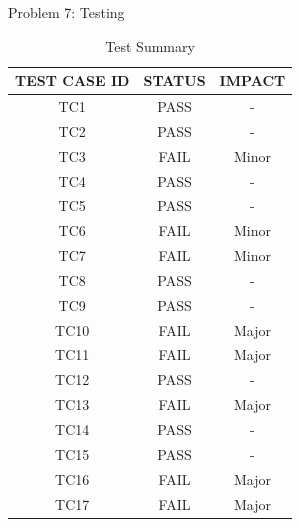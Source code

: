 \documentclass[a4paper,12pt]{article}
\begin{document}
\begin{section}{Problem 7: Testing}
\begin{table}[htp]
	\centering
	\caption{Test Summary} \vspace{0.5cm} \label{tab:difficulty_table} 
	\begin{tabular}{||c|c|c||}
		\hline  \hline \textbf{TEST CASE ID} & \textbf{STATUS} & \textbf{IMPACT} \\
		\hline \hline
		TC1 & PASS & - \\ 
		\hline
		TC2 & PASS & - \\ 
		\hline
		TC3 & FAIL & Minor \\ 
		\hline
		TC4 & PASS & - \\ 
		\hline
		TC5 & PASS & - \\ 
		\hline
		TC6 & FAIL & Minor \\ 
		\hline
		TC7 & FAIL & Minor \\ 
		\hline
		TC8 & PASS & - \\ 
		\hline
		TC9 & PASS & - \\ 
		\hline
		TC10 & FAIL & Major \\ 
		\hline
		TC11 & FAIL & Major \\ 
		\hline
		TC12 & PASS & - \\ 
		\hline
		TC13 & FAIL & Major \\ 
		\hline
		TC14 & PASS & - \\ 
		\hline
		TC15 & PASS & - \\ 
		\hline
		TC16 & FAIL & Major \\ 
		\hline
		TC17 & FAIL & Major \\ 
		\hline	
	\end{tabular}
\end{table}

\end{section}
\end{document}
